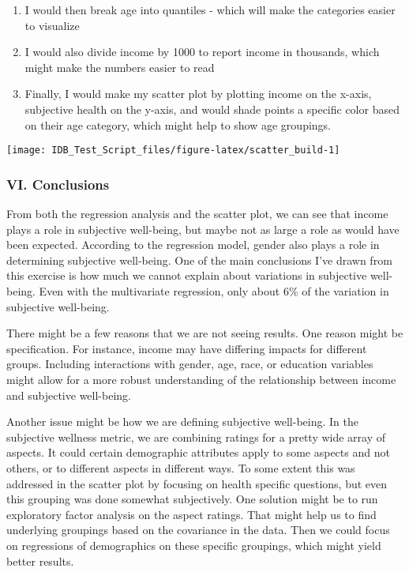 \documentclass[
]{article}
\begin{document}
\begin{enumerate}
\def\labelenumi{\arabic{enumi}.}
\setcounter{enumi}{1}
\item
  I would then break age into quantiles - which will make the categories
  easier to visualize
\item
  I would also divide income by 1000 to report income in thousands,
  which might make the numbers easier to read
\item
  Finally, I would make my scatter plot by plotting income on the
  x-axis, subjective health on the y-axis, and would shade points a
  specific color based on their age category, which might help to show
  age groupings.
\end{enumerate}

\begin{center}\texttt{[image: IDB\_Test\_Script\_files/figure-latex/scatter\_build-1]} \end{center}

\hypertarget{vi.-conclusions}{%
\subsubsection{VI. Conclusions}\label{vi.-conclusions}}

From both the regression analysis and the scatter plot, we can see that
income plays a role in subjective well-being, but maybe not as large a
role as would have been expected. According to the regression model,
gender also plays a role in determining subjective well-being. One of
the main conclusions I've drawn from this exercise is how much we cannot
explain about variations in subjective well-being. Even with the
multivariate regression, only about 6\% of the variation in subjective
well-being.

There might be a few reasons that we are not seeing results. One reason
might be specification. For instance, income may have differing impacts
for different groups. Including interactions with gender, age, race, or
education variables might allow for a more robust understanding of the
relationship between income and subjective well-being.

Another issue might be how we are defining subjective well-being. In the
subjective wellness metric, we are combining ratings for a pretty wide
array of aspects. It could certain demographic attributes apply to some
aspects and not others, or to different aspects in different ways. To
some extent this was addressed in the scatter plot by focusing on health
specific questions, but even this grouping was done somewhat
subjectively. One solution might be to run exploratory factor analysis
on the aspect ratings. That might help us to find underlying groupings
based on the covariance in the data. Then we could focus on regressions
of demographics on these specific groupings, which might yield better
results.
\end{document}
